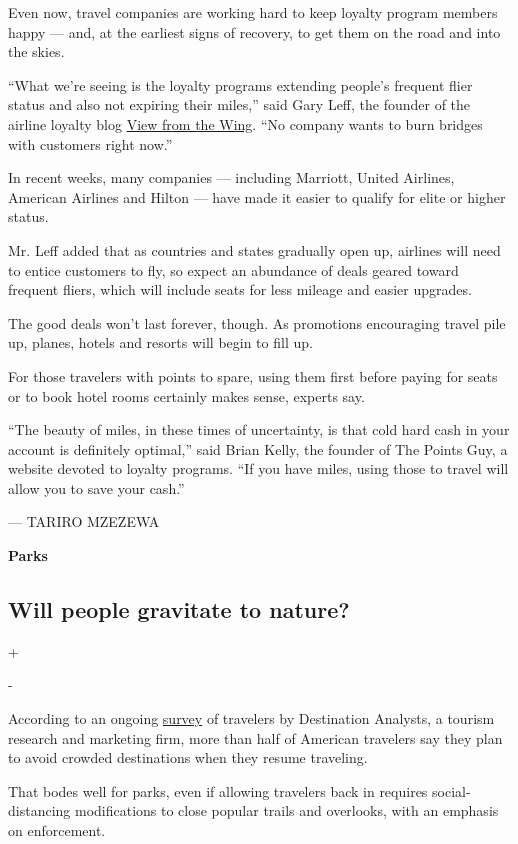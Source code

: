 Even now, travel companies are working hard to keep loyalty program
members happy --- and, at the earliest signs of recovery, to get them on
the road and into the skies.

``What we're seeing is the loyalty programs extending people's frequent
flier status and also not expiring their miles,'' said Gary Leff, the
founder of the airline loyalty blog
\href{https://viewfromthewing.com/}{View from the Wing}. ``No company
wants to burn bridges with customers right now.''

In recent weeks, many companies --- including Marriott, United Airlines,
American Airlines and Hilton --- have made it easier to qualify for
elite or higher status.

Mr. Leff added that as countries and states gradually open up, airlines
will need to entice customers to fly, so expect an abundance of deals
geared toward frequent fliers, which will include seats for less mileage
and easier upgrades.

The good deals won't last forever, though. As promotions encouraging
travel pile up, planes, hotels and resorts will begin to fill up.

For those travelers with points to spare, using them first before paying
for seats or to book hotel rooms certainly makes sense, experts say.

``The beauty of miles, in these times of uncertainty, is that cold hard
cash in your account is definitely optimal,'' said Brian Kelly, the
founder of The Points Guy, a website devoted to loyalty programs. ``If
you have miles, using those to travel will allow you to save your
cash.''

--- TARIRO MZEZEWA

\textbf{Parks}

\hypertarget{will-people-gravitate-to-nature}{%
\subsection{Will people gravitate to
nature?}\label{will-people-gravitate-to-nature}}

+

-

According to an ongoing
\href{https://www.destinationanalysts.com/insights-updates/}{survey} of
travelers by Destination Analysts, a tourism research and marketing
firm, more than half of American travelers say they plan to avoid
crowded destinations when they resume traveling.

That bodes well for parks, even if allowing travelers back in requires
social-distancing modifications to close popular trails and overlooks,
with an emphasis on enforcement.

